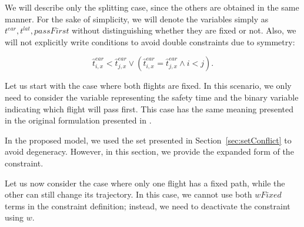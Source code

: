 \documentclass[../thesis.tex]{subfiles}
\begin{document}
We will describe only the splitting case, since the others are obtained in the same manner. 
For the sake of simplicity, we will denote the variables simply as $t^{ear}, t^{lat}, passFirst$ without distinguishing whether they are fixed or not. Also, we will not explicitly write conditions to avoid double constraints due to symmetry:

\[
\hat t^{ear}_{i,x} < \hat t^{ear}_{j,x} \lor (\hat t^{ear}_{i,x} = \hat t^{ear}_{j,x} \land i<j).
\]

Let us start with the case where both flights are fixed. In this scenario, we only need to consider the variable representing the safety time and the binary variable indicating which flight will pass first. 
This case has the same meaning presented in the original formulation presented in \cite{pelegrin-2023}.

In the proposed model, we used the set presented in Section~\ref{sec:setConflict} to avoid degeneracy. However, in this section, we provide the expanded form of the constraint.\newline
{}

Let us now consider the case where only one flight has a fixed path, while the other can still change its trajectory. In this case, we cannot use both $wFixed$ terms in the constraint definition; instead, we need to deactivate the constraint using $w$.
\end{document}
